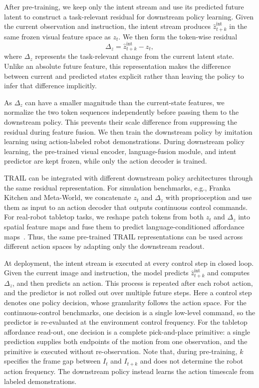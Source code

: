 After pre-training, we keep only the intent stream and use its predicted future latent to construct a task-relevant residual for downstream policy learning. Given the current observation and instruction, the intent stream produces $\hat z^{\mathrm{int}}_{t+k}$ in the same frozen visual feature space as $z_t$. We then form the token-wise residual
%
\begin{equation}
    \Delta_z = \hat z^{\mathrm{int}}_{t+k}-z_t, \label{eq:residual}
\end{equation}
where $\Delta_z$ represents the task-relevant change from the current latent state. Unlike an absolute future feature, this representation makes the difference between current and predicted states explicit rather than leaving the policy to infer that difference implicitly.

As $\Delta_z$ can have a smaller magnitude than the current-state features, we normalize the two token sequences independently before passing them to the downstream policy. This prevents their scale difference from suppressing the residual during feature fusion. We then train the downstream policy by imitation learning using action-labeled robot demonstrations. During downstream policy learning, the pre-trained visual encoder, language-fusion module, and intent predictor are kept frozen, while only the action decoder is trained.


TRAIL can be integrated with different downstream policy architectures through the same residual representation. For simulation benchmarks, e.g., Franka Kitchen and Meta-World, we concatenate $z_t$ and $\Delta_z$ with proprioception and use them as input to an action decoder that outputs continuous control commands. For real-robot tabletop tasks, we reshape patch tokens from both $z_t$ and $\Delta_z$ into spatial feature maps and fuse them to predict language-conditioned affordance maps~\cite{shridhar2022cliport}. Thus, the same pre-trained TRAIL representations can be used across different action spaces by adapting only the downstream readout.

At deployment, the intent stream is executed at every control step in closed loop. Given the current image and instruction, the model predicts $\hat z^{\mathrm{int}}_{t+k}$ and computes $\Delta_z$, and then predicts an action. This process is repeated after each robot action, and the predictor is not rolled out over multiple future steps. Here a control step denotes one policy decision, whose granularity follows the action space. For the continuous-control benchmarks, one decision is a single low-level command, so the predictor is re-evaluated at the environment control frequency. For the tabletop affordance read-out, one decision is a complete pick-and-place primitive: a single prediction supplies both endpoints of the motion from one observation, and the primitive is executed without re-observation. 
Note that, during pre-training, $k$ specifies the frame gap between $I_t$ and $I_{t+k}$ and does not determine the robot action frequency. The downstream policy instead learns the action timescale from labeled demonstrations.




